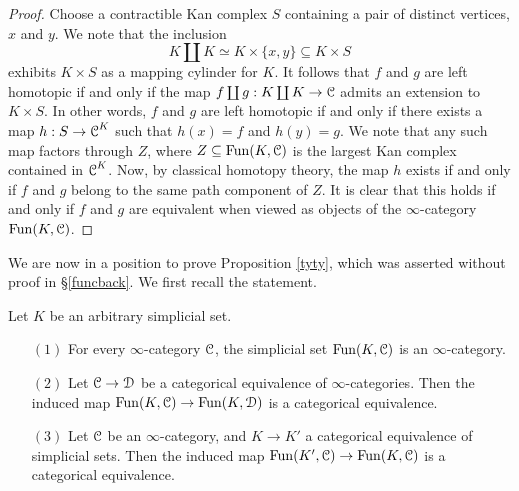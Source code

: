 \begin{proof}
Choose a contractible Kan complex $S$ containing a pair of distinct vertices, $x$ and $y$.
We note that the inclusion
$$ K \coprod K \simeq K \times \{x,y\} \subseteq K \times S$$
exhibits $K \times S$ as a mapping cylinder for $K$. It follows that $f$ and $g$ are left homotopic
if and only if the map $f \coprod g: K \coprod K \rightarrow \operatorname{\mathcal{C}}$ admits an extension to $K \times S$. 
In other words, $f$ and $g$ are left homotopic if and only if there exists a map $h: S \rightarrow \operatorname{\mathcal{C}}^K$ such that $h(x)=f$ and $h(y)=g$. We note that any such map factors through $Z$, where $Z \subseteq \operatorname{Fun}(K,\operatorname{\mathcal{C}})$ is the largest Kan complex contained in $\operatorname{\mathcal{C}}^K$. Now, by classical homotopy theory, the map $h$ exists if and only if $f$ and $g$ belong to the same path component of $Z$. It is clear that this holds if and only if $f$ and $g$ are equivalent when viewed as objects of the $\infty$-category $\operatorname{Fun}(K,\operatorname{\mathcal{C}})$. 
\end{proof}

We are now in a position to prove Proposition \ref{tyty}, which was asserted without proof in
\S \ref{funcback}. We first recall the statement.

\begin{proposition2}
Let $K$ be an arbitrary simplicial set.
\begin{itemize}
\item[$(1)$] For every $\infty$-category $\operatorname{\mathcal{C}}$, the simplicial set $\operatorname{Fun}(K,\operatorname{\mathcal{C}})$ is an $\infty$-category.

\item[$(2)$] Let $\operatorname{\mathcal{C}} \rightarrow \operatorname{\mathcal{D}}$ be a categorical equivalence of $\infty$-categories. Then the induced map $\operatorname{Fun}(K,\operatorname{\mathcal{C}}) \rightarrow \operatorname{Fun}(K,\operatorname{\mathcal{D}})$ is a categorical equivalence.

\item[$(3)$] Let $\operatorname{\mathcal{C}}$ be an $\infty$-category, and $K \rightarrow K'$ a categorical equivalence of simplicial sets. Then the induced map $\operatorname{Fun}(K',\operatorname{\mathcal{C}}) \rightarrow \operatorname{Fun}(K,\operatorname{\mathcal{C}})$ is a categorical equivalence.
\end{itemize}
\end{proposition2}

